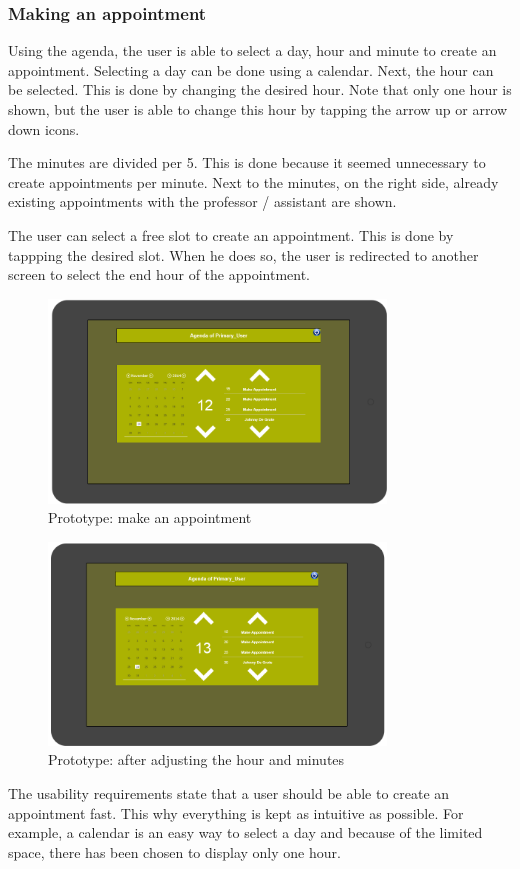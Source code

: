 \documentclass[11pt, a4paper,svglistings]{report}
\begin{document}
\subsubsection{Making an appointment}

Using the agenda, the user is able to select a day, hour and minute to create an appointment. Selecting a day can be done using a calendar. Next, the hour can be selected. This is done by changing the desired hour. Note that only one hour is shown, but the user is able to change this hour by tapping the arrow up or arrow down icons.

The minutes are divided per 5. This is done because it seemed unnecessary to create appointments per minute. Next to the minutes, on the right side, already existing appointments with the professor / assistant are shown.

The user can select a free slot to create an appointment. This is done by tappping the desired slot. When he does so, the user is redirected to another screen to select the end hour of the appointment.

\begin{figure}[H]
\centering
    \includegraphics[width=0.8\textwidth]{Prototypes/MakeAppointment.png}
  \caption{Prototype: make an appointment}
\end{figure}

\begin{figure}[H]
\centering
    \includegraphics[width=0.8\textwidth]{Prototypes/MakeAppointment2.png}
  \caption{Prototype: after adjusting the hour and minutes}
\end{figure}
The usability requirements state that a user should be able to create an appointment fast. This why everything is kept as intuitive as possible. For example, a calendar is an easy way to select a day and because of the limited space, there has been chosen to display only one hour.
\end{document}
